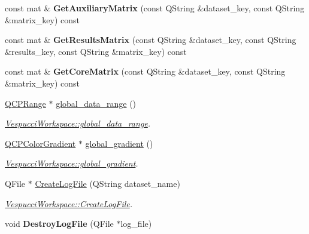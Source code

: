 \begin{DoxyCompactItemize}
\item 
const mat \& {\bfseries Get\+Auxiliary\+Matrix} (const Q\+String \&dataset\+\_\+key, const Q\+String \&matrix\+\_\+key) const \hypertarget{class_vespucci_workspace_ac387cb14cc609dc1bb7e5fdc081a113f}{}\label{class_vespucci_workspace_ac387cb14cc609dc1bb7e5fdc081a113f}

\item 
const mat \& {\bfseries Get\+Results\+Matrix} (const Q\+String \&dataset\+\_\+key, const Q\+String \&results\+\_\+key, const Q\+String \&matrix\+\_\+key) const \hypertarget{class_vespucci_workspace_a05ef6e4f7ca7158947e9ef1f8a28e9e3}{}\label{class_vespucci_workspace_a05ef6e4f7ca7158947e9ef1f8a28e9e3}

\item 
const mat \& {\bfseries Get\+Core\+Matrix} (const Q\+String \&dataset\+\_\+key, const Q\+String \&matrix\+\_\+key) const \hypertarget{class_vespucci_workspace_af6e3bc8a44ea69e401b9464da3d2e946}{}\label{class_vespucci_workspace_af6e3bc8a44ea69e401b9464da3d2e946}

\item 
\hyperlink{class_q_c_p_range}{Q\+C\+P\+Range} $\ast$ \hyperlink{class_vespucci_workspace_abaf4eecf7d203d86576483384280fe7e}{global\+\_\+data\+\_\+range} ()
\begin{DoxyCompactList}\small\item\em \hyperlink{class_vespucci_workspace_abaf4eecf7d203d86576483384280fe7e}{Vespucci\+Workspace\+::global\+\_\+data\+\_\+range}. \end{DoxyCompactList}\item 
\hyperlink{class_q_c_p_color_gradient}{Q\+C\+P\+Color\+Gradient} $\ast$ \hyperlink{class_vespucci_workspace_a5f48f7a39986081e485eb23df00a5428}{global\+\_\+gradient} ()
\begin{DoxyCompactList}\small\item\em \hyperlink{class_vespucci_workspace_a5f48f7a39986081e485eb23df00a5428}{Vespucci\+Workspace\+::global\+\_\+gradient}. \end{DoxyCompactList}\item 
Q\+File $\ast$ \hyperlink{class_vespucci_workspace_a146009858a8dcd88e46a695ce9d5c965}{Create\+Log\+File} (Q\+String dataset\+\_\+name)
\begin{DoxyCompactList}\small\item\em \hyperlink{class_vespucci_workspace_a146009858a8dcd88e46a695ce9d5c965}{Vespucci\+Workspace\+::\+Create\+Log\+File}. \end{DoxyCompactList}\item 
void {\bfseries Destroy\+Log\+File} (Q\+File $\ast$log\+\_\+file)\hypertarget{class_vespucci_workspace_a9b26bd75e754f0413760b68716033b74}{}\label{class_vespucci_workspace_a9b26bd75e754f0413760b68716033b74}


\end{DoxyCompactItemize}
